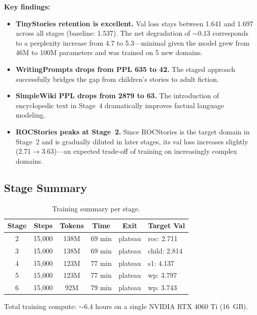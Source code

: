 \textbf{Key findings:}
\begin{itemize}[nosep]
  \item \textbf{TinyStories retention is excellent.}  Val loss stays between
        1.641 and 1.697 across all stages (baseline: 1.537).  The net
        degradation of ${\sim}0.13$ corresponds to a perplexity increase
        from 4.7 to 5.3---minimal given the model grew from 46M to 100M
        parameters and was trained on 5 new domains.
  \item \textbf{WritingPrompts drops from PPL 635 to 42.}  The staged approach
        successfully bridges the gap from children's stories to adult fiction.
  \item \textbf{SimpleWiki PPL drops from 2879 to 63.}  The introduction of
        encyclopedic text in Stage~4 dramatically improves factual language
        modeling.
  \item \textbf{ROCStories peaks at Stage~2.}  Since ROCStories is the
        target domain in Stage~2 and is gradually diluted in later stages,
        its val loss increases slightly (2.71$\to$3.63)---an expected
        trade-off of training on increasingly complex domains.
\end{itemize}

\subsection{Stage Summary}

\begin{table}[H]
\centering\small
\caption{Training summary per stage.}
\begin{tabular}{cccccl}
\toprule
\textbf{Stage} & \textbf{Steps} & \textbf{Tokens} & \textbf{Time} &
\textbf{Exit} & \textbf{Target Val} \\
\midrule
2 & 15{,}000 & 138M & 69 min & plateau & roc: 2.711 \\
3 & 15{,}000 & 138M & 69 min & plateau & child: 2.814 \\
4 & 15{,}000 & 123M & 77 min & plateau & s1: 4.137 \\
5 & 15{,}000 & 123M & 77 min & plateau & wp: 3.797 \\
6 & 15{,}000 &  92M & 79 min & plateau & wp: 3.743 \\
\bottomrule
\end{tabular}
\end{table}

Total training compute: $\sim$6.4 hours on a single NVIDIA RTX 4060 Ti (16~GB).

